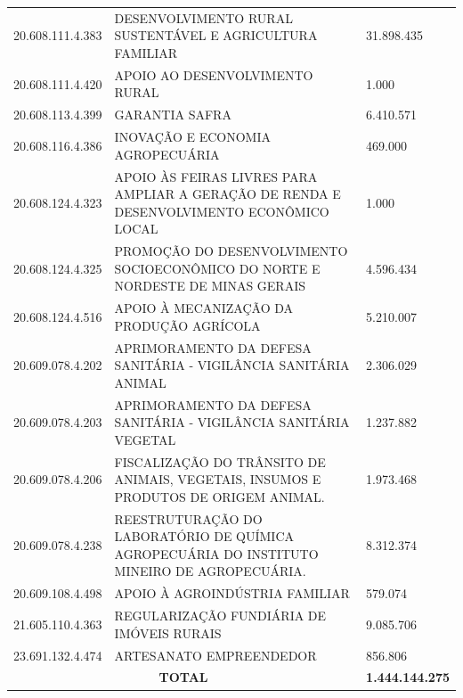 \documentclass{article}
\begin{document}
\begin{longtable}[c]{m{3cm}|m{12cm}|m{2cm}}
\multicolumn{1}{C{3cm}|}{20.608.111.4.383} & \multicolumn{1}{L{12cm}|}{DESENVOLVIMENTO RURAL SUSTENTÁVEL E AGRICULTURA FAMILIAR} & \multicolumn{1}{R{2cm}}{31.898.435} \\
\multicolumn{1}{C{3cm}|}{20.608.111.4.420} & \multicolumn{1}{L{12cm}|}{APOIO AO DESENVOLVIMENTO RURAL} & \multicolumn{1}{R{2cm}}{1.000} \\
\multicolumn{1}{C{3cm}|}{20.608.113.4.399} & \multicolumn{1}{L{12cm}|}{GARANTIA SAFRA} & \multicolumn{1}{R{2cm}}{6.410.571} \\
\multicolumn{1}{C{3cm}|}{20.608.116.4.386} & \multicolumn{1}{L{12cm}|}{INOVAÇÃO E ECONOMIA AGROPECUÁRIA} & \multicolumn{1}{R{2cm}}{469.000} \\
\multicolumn{1}{C{3cm}|}{20.608.124.4.323} & \multicolumn{1}{L{12cm}|}{APOIO ÀS FEIRAS LIVRES PARA AMPLIAR A GERAÇÃO DE RENDA E DESENVOLVIMENTO ECONÔMICO LOCAL} & \multicolumn{1}{R{2cm}}{1.000} \\
\multicolumn{1}{C{3cm}|}{20.608.124.4.325} & \multicolumn{1}{L{12cm}|}{PROMOÇÃO DO DESENVOLVIMENTO SOCIOECONÔMICO DO NORTE E NORDESTE DE MINAS GERAIS} & \multicolumn{1}{R{2cm}}{4.596.434} \\
\multicolumn{1}{C{3cm}|}{20.608.124.4.516} & \multicolumn{1}{L{12cm}|}{APOIO À MECANIZAÇÃO DA PRODUÇÃO AGRÍCOLA} & \multicolumn{1}{R{2cm}}{5.210.007} \\
\multicolumn{1}{C{3cm}|}{20.609.078.4.202} & \multicolumn{1}{L{12cm}|}{APRIMORAMENTO DA DEFESA SANITÁRIA - VIGILÂNCIA SANITÁRIA ANIMAL} & \multicolumn{1}{R{2cm}}{2.306.029} \\
\multicolumn{1}{C{3cm}|}{20.609.078.4.203} & \multicolumn{1}{L{12cm}|}{APRIMORAMENTO DA DEFESA SANITÁRIA - VIGILÂNCIA SANITÁRIA VEGETAL} & \multicolumn{1}{R{2cm}}{1.237.882} \\
\multicolumn{1}{C{3cm}|}{20.609.078.4.206} & \multicolumn{1}{L{12cm}|}{FISCALIZAÇÃO DO TRÂNSITO DE ANIMAIS, VEGETAIS, INSUMOS E PRODUTOS DE ORIGEM ANIMAL.} & \multicolumn{1}{R{2cm}}{1.973.468} \\
\multicolumn{1}{C{3cm}|}{20.609.078.4.238} & \multicolumn{1}{L{12cm}|}{REESTRUTURAÇÃO DO LABORATÓRIO DE QUÍMICA AGROPECUÁRIA DO INSTITUTO MINEIRO DE AGROPECUÁRIA.} & \multicolumn{1}{R{2cm}}{8.312.374} \\
\multicolumn{1}{C{3cm}|}{20.609.108.4.498} & \multicolumn{1}{L{12cm}|}{APOIO À AGROINDÚSTRIA FAMILIAR} & \multicolumn{1}{R{2cm}}{579.074} \\
\multicolumn{1}{C{3cm}|}{21.605.110.4.363} & \multicolumn{1}{L{12cm}|}{REGULARIZAÇÃO FUNDIÁRIA DE IMÓVEIS RURAIS} & \multicolumn{1}{R{2cm}}{9.085.706} \\
\multicolumn{1}{C{3cm}|}{23.691.132.4.474} & \multicolumn{1}{L{12cm}|}{ARTESANATO EMPREENDEDOR} & \multicolumn{1}{R{2cm}}{856.806} \\
\hline\hline
\multicolumn{2}{c|}{ \textbf{TOTAL}} & \multicolumn{1}{R{2cm}}{ \textbf{1.444.144.275}} \\\hline\hline\end{longtable}
\end{document}
